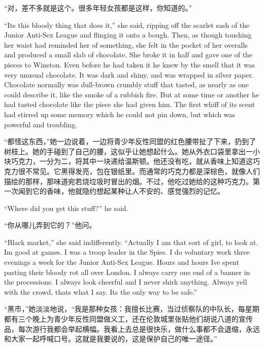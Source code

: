 \begin{paracol}{2}
\switchcolumn

``对，差不多就是这个。很多年轻女孩都是这样，你知道的。''

\switchcolumn*

``It\textquotesingle s this bloody thing that does it,'' she said, ripping
off the scarlet sash of the Junior Anti-Sex League and flinging it onto
a bough. Then, as though touching her waist had reminded her of
something, she felt in the pocket of her overalls and produced a small
slab of chocolate. She broke it in half and gave one of the pieces to
Winston. Even before he had taken it he knew by the smell that it was
very unusual chocolate. It was dark and shiny, and was wrapped in silver
paper. Chocolate normally was dull-brown crumbly stuff that tasted, as
nearly as one could describe it, like the smoke of a rubbish fire. But
at some time or another he had tasted chocolate like the piece she had
given him. The first whiff of its scent had stirred up some memory which
he could not pin down, but which was powerful and troubling.

\switchcolumn

``都怪这东西，''她一边说着，一边将青少年反性同盟的红色腰带扯了下来，扔到了树枝上。她的手碰到了自己的腰，这似乎让她想起什么。她从外衣口袋里拿出一小块巧克力，一分为二，将其中一块递给温斯顿。他还没有吃，就从香味上知道这巧克力很不常见。它黑得发亮，包在银纸里。而通常的巧克力都是深棕色，就像人们描绘的那样，那味道宛若烧垃圾时冒出的烟。不过，他吃过她给的这种巧克力。第一次闻到它的香味，他就隐约想起某种让人不安的、感觉强烈的记忆。

\switchcolumn*

``Where did you get this stuff?'' he said.

\switchcolumn

``你从哪儿弄到它的？''他问。

\switchcolumn*

``Black market,'' she said indifferently. ``Actually I am that sort of
girl, to look at. I\textquotesingle m good at games. I was a troop
leader in the Spies. I do voluntary work three evenings a week for the
Junior Anti-Sex League. Hours and hours I\textquotesingle ve spent
pasting their bloody rot all over London. I always carry one end of a
banner in the processions. I always look cheerful and I never shirk
anything. Always yell with the crowd, that\textquotesingle s what I say.
It\textquotesingle s the only way to be safe.''

\switchcolumn

``黑市，''她淡淡地说，``我是那种女孩：我擅长比赛，当过侦察队的中队长，每星期都有三个晚上为青少年反性同盟做义工，还在伦敦城里张贴他们胡说八道的宣传品，每次游行我都会举起横幅。我看上去总是很快乐，做什么事都不会退缩，永远和大家一起呼喊口号。这就是我要说的，这是保护自己的唯一途径。''


\end{paracol}
